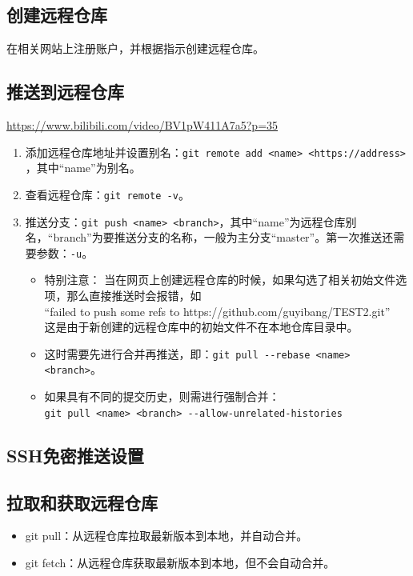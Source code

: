 \subsection{创建远程仓库}
在相关网站上注册账户，并根据指示创建远程仓库。



\subsection{推送到远程仓库}
\url{https://www.bilibili.com/video/BV1pW411A7a5?p=35}
\begin{enumerate}
\item 添加远程仓库地址并设置别名：\verb|git remote add <name> <https://address> |，其中“name”为别名。
\item 查看远程仓库：\verb|git remote -v|。
\item 推送分支：\verb|git push <name> <branch>|，其中“name”为远程仓库别名，“branch”为要推送分支的名称，一般为主分支“master”。第一次推送还需要参数：\verb|-u|。
\begin{itemize}
\item 特别注意： 当在网页上创建远程仓库的时候，如果勾选了相关初始文件选项，那么直接推送时会报错，如\\
“failed to push some refs to https://github.com/guyibang/TEST2.git”\\
这是由于新创建的远程仓库中的初始文件不在本地仓库目录中。
\item 这时需要先进行合并再推送，即：\verb|git pull --rebase <name> <branch>|。
\item 如果具有不同的提交历史，则需进行强制合并：\\ 
\verb|git pull <name> <branch> --allow-unrelated-histories |
\end{itemize}
\end{enumerate}




\subsection{SSH免密推送设置}




\subsection{拉取和获取远程仓库}
\begin{itemize}
\item git pull：从远程仓库拉取最新版本到本地，并自动合并。
\item git fetch：从远程仓库获取最新版本到本地，但不会自动合并。
\end{itemize}


